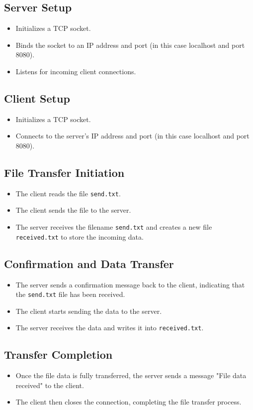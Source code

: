 \subsection{Server Setup}

\begin{itemize}
    \item Initializes a TCP socket.
    \item Binds the socket to an IP address and port (in this case localhost and port 8080).
    \item Listens for incoming client connections.
\end{itemize}

\subsection{Client Setup}

\begin{itemize}
    \item Initializes a TCP socket.
    \item Connects to the server's IP address and port (in this case localhost and port 8080).
\end{itemize}

\subsection{File Transfer Initiation}

\begin{itemize}
    \item The client reads the file \verb|send.txt|.
    \item The client sends the file to the server.
    \item The server receives the filename \verb|send.txt| and creates a new file \verb|received.txt| to store the incoming data.
\end{itemize}

\subsection{Confirmation and Data Transfer}

\begin{itemize}
    \item The server sends a confirmation message back to the client, indicating that the \verb|send.txt| file has been received.
    \item The client starts sending the data to the server.
    \item The server receives the data and writes it into \verb|received.txt|.
\end{itemize}

\subsection{Transfer Completion}

\begin{itemize}
    \item Once the file data is fully transferred, the server sends a message "File data received" to the client.
    \item The client then closes the connection, completing the file transfer process.
\end{itemize}